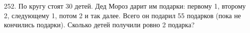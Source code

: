 252. По кругу стоят 30 детей. Дед Мороз дарит им подарки: первому 1, второму 2, следующему 1, потом 2 и так далее. Всего он подарил 55 подарков (пока не кончились подарки). Сколько детей получили ровно 2 подарка?\\
